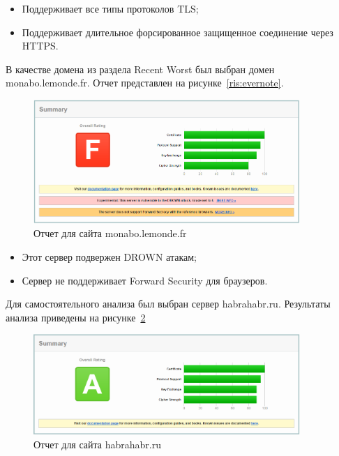 \documentclass[10pt,a4paper]{report}
\begin{document}
			\begin{itemize}
				\item Поддерживает все типы протоколов TLS;
				\item Поддерживает длительное форсированное защищенное соединение через 
				HTTPS.
			\end{itemize}
			
			В качестве домена из раздела Recent Worst был выбран домен 
			monabo.lemonde.fr.
			Отчет представлен на рисунке~\ref{ris:evernote}.
			
			\begin{figure}[h]
				\centering
				\includegraphics[width=0.9\textwidth]{res/monabo}
				\caption{Отчет для сайта monabo.lemonde.fr}
				\label{ris:monabo}
			\end{figure}
			
			\begin{itemize}
				\item Этот сервер подвержен DROWN атакам;
				\item Сервер не поддерживает Forward Security для браузеров.
			\end{itemize}
			
			Для самостоятельного анализа был выбран сервер habrahabr.ru.
			Результаты анализа приведены на рисунке~\ref{ris:habr}
			
			\begin{figure}[h]
				\centering
				\includegraphics[width=0.9\textwidth]{res/habr}
				\caption{Отчет для сайта habrahabr.ru}
				\label{ris:habr}
			\end{figure}
			
\end{document}
